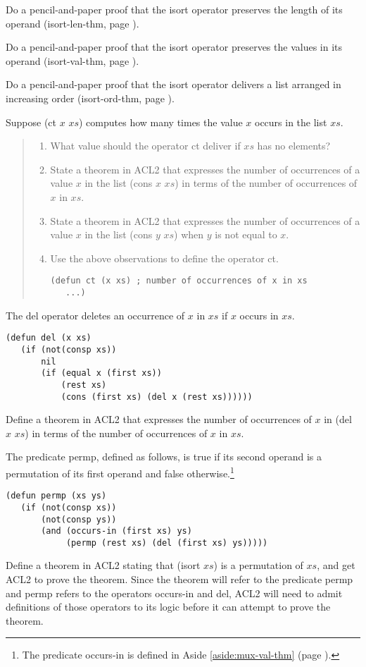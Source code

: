 \begin{ExerciseList}
\Exercise
Do a pencil-and-paper proof that the isort operator
preserves the length of its operand
(isort-len-thm, page \pageref{defthm:isort-len}).

\Exercise
Do a pencil-and-paper proof that the isort operator
preserves the values in its operand
(isort-val-thm, page \pageref{defthm:isort-val}).

\Exercise
Do a pencil-and-paper proof that the isort operator
delivers a list arranged in increasing order
(isort-ord-thm, page \pageref{defthm:isort-ord-thm}).

\Exercise
Suppose (ct $x$ $xs$) computes how many times
the value $x$ occurs in the list $xs$.
\begin{quote}
\begin{enumerate}[label=\alph*{. }]
\item What value should the operator ct deliver if $xs$ has no elements?
\item State a theorem in ACL2 that expresses the
      number of occurrences of a value $x$ in the list (cons $x$ $xs$)
      in terms of the number of occurrences of $x$ in $xs$.
\item State a theorem in ACL2 that expresses the
      number of occurrences of a value $x$ in the list (cons $y$ $xs$)
      when $y$ is not equal to $x$.
\item Use the above observations to define the operator ct.
\begin{verbatim}
(defun ct (x xs) ; number of occurrences of x in xs
   ...)
\end{verbatim}
\end{enumerate}
\end{quote}

\Exercise
The del operator deletes an occurrence of $x$ in $xs$
if $x$ occurs in $xs$.
\label{defun:del}
\begin{Verbatim}
(defun del (x xs)
   (if (not(consp xs))
       nil
       (if (equal x (first xs))
           (rest xs)
           (cons (first xs) (del x (rest xs))))))
\end{Verbatim}
Define a theorem in ACL2 that
expresses the number of occurrences of $x$ in (del $x$ $xs$)
in terms of the number of occurrences of $x$ in $xs$.

\Exercise
The predicate permp, defined as follows, is true if its second operand
is a permutation of its first operand and false otherwise.\footnote{The
predicate occurs-in is defined in
Aside \ref{aside:mux-val-thm} (page \pageref{aside:mux-val-thm}).}
\label{defun:permp}
\begin{Verbatim}
(defun permp (xs ys)
   (if (not(consp xs))
       (not(consp ys))
       (and (occurs-in (first xs) ys)
            (permp (rest xs) (del (first xs) ys)))))
\end{Verbatim}
Define a theorem in ACL2 stating that (isort $xs$) is a
permutation of $xs$, and
get ACL2 to prove the theorem.
Since the theorem will refer to the predicate permp
and permp refers to the operators occurs-in and del,
ACL2 will need to admit definitions of those operators
to its logic before it can attempt to prove the theorem.

\end{ExerciseList}


